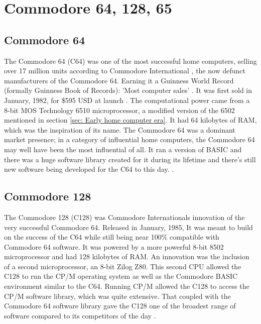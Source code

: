 \section{Commodore 64, 128, 65}
\subsection{Commodore 64}
The Commodore 64 (C64) was one of the most successful home computers, selling over 17 million units according to Commodore International 
\cite{RN42}, the now defunct manufacturers of the Commodore 64. Earning it a Guinness World Record (formally Guinness Book of Records): 'Most computer sales'
\cite{RN43}.
It was first sold in January, 1982, for \$595 USD at launch 
\cite{RN28}. The computational power came from a 8-bit MOS Technology 6510 microprocessor, a modified version of the 6502 mentioned in section \ref{sec: Early home computer era}. It had 64 kilobytes of RAM, which was the inspiration of its name. The Commodore 64 was a dominant market presence; in a category of influential home computers, the Commodore 64 may well have been the most influential of all. It ran a version of BASIC and there was a huge software library created for it during its lifetime and there's still new software being developed for the C64 to this day.
\cite{RN82}\cite{RN83}\cite{RN84}.

\subsection{Commodore 128}
The Commodore 128 (C128) was Commodore Internationals innovation of the very successful Commodore 64. Released in January, 1985, It was meant to build on the success of the C64 while still being near 100\% compatible with Commodore 64 software. It was powered by a more powerful 8-bit 8502 microprocessor and had 128 kilobytes of RAM. An innovation was the inclusion of a second microprocessor, an 8-bit Zilog Z80. This second CPU allowed the C128 to run the CP/M operating system as well as the Commodore BASIC environment similar to the C64. Running CP/M allowed the C128 to access the CP/M software library, which was quite extensive. That coupled with the Commodore 64 software library gave the C128 one of the broadest range of software compared to its competitors of the day
\cite{RN32}.

